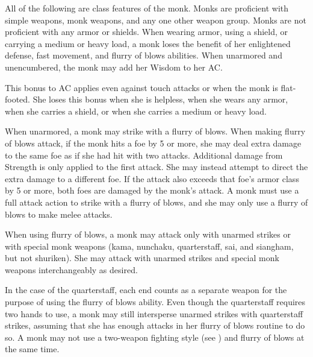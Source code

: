 All of the following are class features of the monk.
Monks are proficient with simple weapons, monk weapons,  and any one other weapon group.  Monks are not proficient with any armor or shields. When wearing armor, using a shield, or carrying a medium or heavy load, a monk loses the benefit of her  enlightened defense,  fast movement, and flurry of blows abilities.
   When unarmored and unencumbered, the monk may add her Wisdom to her AC.

\par This bonus to AC applies even against touch attacks or when the monk is flat-footed. She loses this bonus when she is helpless, when she wears any armor, when she carries a shield, or when she carries a medium or heavy load.

\begin{comment}    %
 \cfnl{\Ki Ward (Ex)}\label{Mnk:Ki Ward (Ex)} When unarmored and unencumbered, a monk gains a \plus1 armor bonus to AC at 2nd level. This bonus increases by 1 for every two monk levels thereafter (\plus2 at 4th, \plus3 at 6th, etc.).

\par The monk loses this bonus when she is
immobilized or helpless, when she wears any armor, when she carries a shield, or when she carries a medium or heavy load.
\end{comment}

   When unarmored, a monk may strike with a flurry of blows. When making flurry of blows attack, if the monk hits a foe by 5 or more, she may deal extra damage to the same foe as if she had hit with two attacks. Additional damage from Strength is only applied to the first attack. She may instead attempt to direct the extra damage to a different foe. If the attack also exceeds that foe's armor class by 5 or more, both foes are damaged by the monk's attack. A monk must use a full attack action to strike with a flurry of blows, and she may only use a flurry of blows to make melee attacks.

\par When using flurry of blows, a monk may attack only with unarmed strikes or with special monk weapons (kama, nunchaku, quarterstaff, sai, and siangham, but not shuriken). She may attack with unarmed strikes and special monk weapons interchangeably as desired.

In the case of the quarterstaff, each end counts as a separate weapon for the purpose of using the flurry of blows ability. Even though the quarterstaff requires two hands to use, a monk may still intersperse unarmed strikes with quarterstaff strikes, assuming that she has enough attacks in her flurry of blows routine to do so. A monk may not use a two-weapon fighting style (see ) and flurry of blows at the same time.

